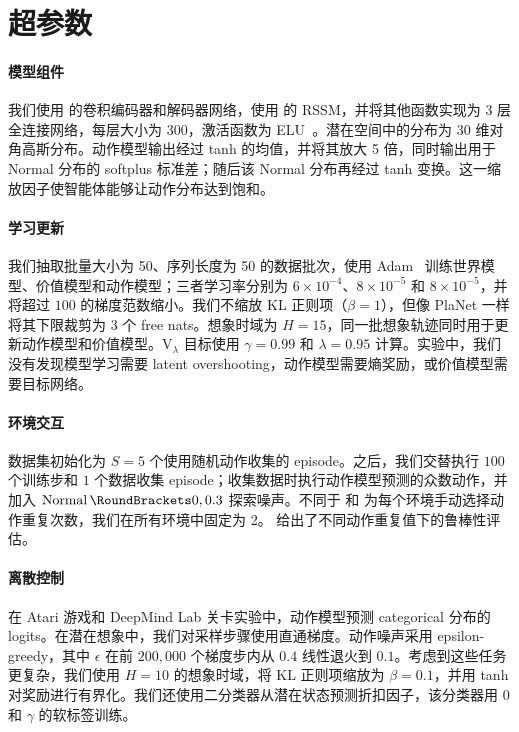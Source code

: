 \section{超参数}
\label{sec:hparams}

\paragraph{模型组件}

我们使用 \citet{ha2018worldmodels} 的卷积编码器和解码器网络，使用 \citet{hafner2018planet} 的 RSSM，并将其他函数实现为 3 层全连接网络，每层大小为 $300$，激活函数为 ELU~\citep{clevert2015elu}。潜在空间中的分布为 30 维对角高斯分布。动作模型输出经过 tanh 的均值，并将其放大 5 倍，同时输出用于 Normal 分布的 softplus 标准差；随后该 Normal 分布再经过 tanh 变换\citep{haarnoja2018sac}。这一缩放因子使智能体能够让动作分布达到饱和。

\paragraph{学习更新}

我们抽取批量大小为 50、序列长度为 50 的数据批次，使用 Adam~\citep{kingma2014adam} 训练世界模型、价值模型和动作模型；三者学习率分别为 $6\times10^{-4}$、$8\times10^{-5}$ 和 $8\times10^{-5}$，并将超过 $100$ 的梯度范数缩小。我们不缩放 KL 正则项（$\beta=1$），但像 PlaNet 一样将其下限裁剪为 $3$ 个 free nats。想象时域为 $H=15$，同一批想象轨迹同时用于更新动作模型和价值模型。$\mathrm{V}_\lambda$ 目标使用 $\gamma=0.99$ 和 $\lambda=0.95$ 计算。实验中，我们没有发现模型学习需要 latent overshooting，动作模型需要熵奖励，或价值模型需要目标网络。

\paragraph{环境交互}

数据集初始化为 $S=5$ 个使用随机动作收集的 episode。之后，我们交替执行 $100$ 个训练步和 $1$ 个数据收集 episode；收集数据时执行动作模型预测的众数动作，并加入 $\Normal(0,0.3)$ 探索噪声。不同于 \citet{hafner2018planet} 和 \citet{lee2019slac} 为每个环境手动选择动作重复次数，我们在所有环境中固定为 2。 给出了不同动作重复值下的鲁棒性评估。

\paragraph{离散控制}

在 Atari 游戏和 DeepMind Lab 关卡实验中，动作模型预测 categorical 分布的 logits。在潜在想象中，我们对采样步骤使用直通梯度。动作噪声采用 epsilon-greedy，其中 $\epsilon$ 在前 $200,000$ 个梯度步内从 $0.4$ 线性退火到 $0.1$。考虑到这些任务更复杂，我们使用 $H=10$ 的想象时域，将 KL 正则项缩放为 $\beta=0.1$，并用 tanh 对奖励进行有界化。我们还使用二分类器从潜在状态预测折扣因子，该分类器用 $0$ 和 $\gamma$ 的软标签训练。

